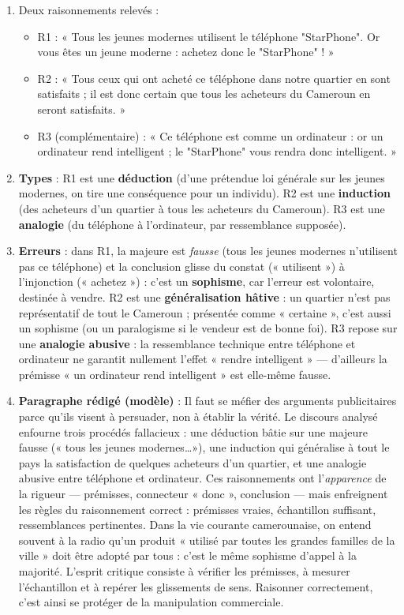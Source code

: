 \documentclass[11pt]{article}
\begin{document}
\begin{corrige}
\begin{enumerate}
\item Deux raisonnements relevés :
\begin{itemize}
\item R1 : « Tous les jeunes modernes utilisent le téléphone "StarPhone". Or vous êtes un jeune moderne : achetez donc le "StarPhone" ! »
\item R2 : « Tous ceux qui ont acheté ce téléphone dans notre quartier en sont satisfaits ; il est donc certain que tous les acheteurs du Cameroun en seront satisfaits. »
\item R3 (complémentaire) : « Ce téléphone est comme un ordinateur : or un ordinateur rend intelligent ; le "StarPhone" vous rendra donc intelligent. »
\end{itemize}
\item \textbf{Types} : R1 est une \textbf{déduction} (d'une prétendue loi générale sur les jeunes modernes, on tire une conséquence pour un individu). R2 est une \textbf{induction} (des acheteurs d'un quartier à tous les acheteurs du Cameroun). R3 est une \textbf{analogie} (du téléphone à l'ordinateur, par ressemblance supposée).
\item \textbf{Erreurs} : dans R1, la majeure est \emph{fausse} (tous les jeunes modernes n'utilisent pas ce téléphone) et la conclusion glisse du constat (« utilisent ») à l'injonction (« achetez ») : c'est un \textbf{sophisme}, car l'erreur est volontaire, destinée à vendre. R2 est une \textbf{généralisation hâtive} : un quartier n'est pas représentatif de tout le Cameroun ; présentée comme « certaine », c'est aussi un sophisme (ou un paralogisme si le vendeur est de bonne foi). R3 repose sur une \textbf{analogie abusive} : la ressemblance technique entre téléphone et ordinateur ne garantit nullement l'effet « rendre intelligent » — d'ailleurs la prémisse « un ordinateur rend intelligent » est elle-même fausse.
\item \textbf{Paragraphe rédigé (modèle)} : Il faut se méfier des arguments publicitaires parce qu'ils visent à persuader, non à établir la vérité. Le discours analysé enfourne trois procédés fallacieux : une déduction bâtie sur une majeure fausse (« tous les jeunes modernes\ldots »), une induction qui généralise à tout le pays la satisfaction de quelques acheteurs d'un quartier, et une analogie abusive entre téléphone et ordinateur. Ces raisonnements ont l'\emph{apparence} de la rigueur — prémisses, connecteur « donc », conclusion — mais enfreignent les règles du raisonnement correct : prémisses vraies, échantillon suffisant, ressemblances pertinentes. Dans la vie courante camerounaise, on entend souvent à la radio qu'un produit « utilisé par toutes les grandes familles de la ville » doit être adopté par tous : c'est le même sophisme d'appel à la majorité. L'esprit critique consiste à vérifier les prémisses, à mesurer l'échantillon et à repérer les glissements de sens. Raisonner correctement, c'est ainsi se protéger de la manipulation commerciale.

\end{enumerate}
\end{corrige}
\end{document}
